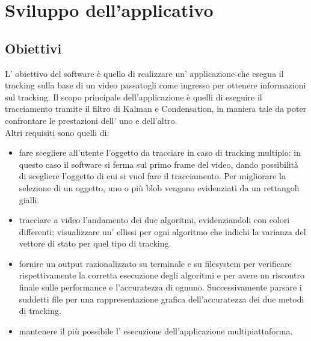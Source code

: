 
\section{Sviluppo dell'applicativo}

\subsection{Obiettivi}
L' obiettivo del software è quello di realizzare un' applicazione che esegua il tracking sulla base di un video passatogli come ingresso per ottenere informazioni sul tracking. Il scopo principale dell'applicazione è quelli di eseguire il tracciamento tramite il filtro di Kalman e Condensation, in maniera tale da poter confrontare le prestazioni dell' uno e dell'altro.\\
Altri requisiti sono quelli di:

\begin{itemize}
 \item  fare scegliere all'utente l'oggetto da tracciare in caso di tracking multiplo: in questo caso il software si ferma sul primo frame del video, dando possibilità di scegliere l'oggetto di cui si vuol fare il tracciamento. Per migliorare la selezione di un oggetto, uno o più blob  vengono evidenziati da un rettangoli gialli.

\item tracciare a video l'andamento dei due algoritmi, evidenziandoli con colori differenti; visualizzare un' ellissi per ogni algoritmo che indichi la varianza del vettore di stato per quel tipo di tracking.

\item fornire un output razionalizzato su terminale e su filesystem per verificare rispettivamente la corretta esecuzione degli algoritmi e per avere un riscontro finale sulle performance e l'accuratezza di ognuno. Successivamente parsare i suddetti file per una rappresentazione grafica dell'accuratezza dei due metodi di tracking.

\item mantenere il più possibile l' esecuzione dell'applicazione multipiattaforma. 


\end{itemize}

